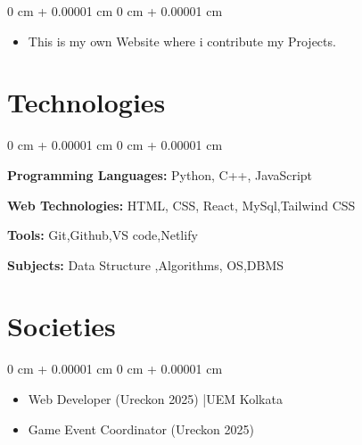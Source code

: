 \documentclass[12pt, a3paper]{article}
\newenvironment{highlights}{
    \begin{itemize}[
        topsep=0.10 cm,
        parsep=0.10 cm,
        partopsep=0pt,
        itemsep=0pt,
        leftmargin=0 cm + 10pt
    ]
}{
    \end{itemize}
} %
\newenvironment{highlightsforbulletentries}{
    \begin{itemize}[
        topsep=0.10 cm,
        parsep=0.10 cm,
        partopsep=0pt,
        itemsep=0pt,
        leftmargin=10pt
    ]
}{
    \end{itemize}
} %
\newenvironment{onecolentry}{
    \begin{adjustwidth}{
        0 cm + 0.00001 cm
    }{
        0 cm + 0.00001 cm
    }
}{
    \end{adjustwidth}
} %
\begin{document}
            \vspace{0.10 cm}
            \begin{onecolentry}
                \begin{highlights}
                    \item This is my own Website where i contribute my Projects.
                    \end{highlights}
            \end{onecolentry}


        \vspace{0.2 cm}

        \vspace{0.7 cm}


    
    \section{Technologies}

        
        \begin{onecolentry}
            \item \textbf{Programming Languages:} Python, C++, JavaScript
            \item \textbf{Web Technologies:} HTML, CSS, React, MySql,Tailwind CSS
            \item \textbf{Tools:} Git,Github,VS code,Netlify
            \item \textbf{Subjects:} Data Structure ,Algorithms, OS,DBMS
        \end{onecolentry}

        \vspace{0.7 cm}
        \section{Societies}

        \begin{onecolentry}
            \begin{highlightsforbulletentries}
    
    
            \item Web Developer (Ureckon 2025) |UEM Kolkata
            \item Game Event Coordinator (Ureckon 2025)    
    
            \end{highlightsforbulletentries}
        \end{onecolentry}
        \vspace{0.7 cm}
\end{document}
